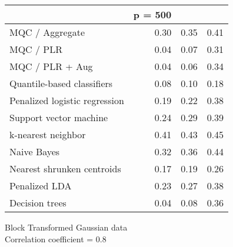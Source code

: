 \begin{table}[p]
\begin{minipage}{0.49\textwidth}
{\begin{tabular}{lrrr}
        \hline
        & p = 500 \\
        \hline

        MQC / Aggregate & 0.30 & 0.35 & 0.41 \\ 
        MQC / PLR & 0.04 & 0.07 & 0.31 \\ 
        MQC / PLR + Aug & 0.04 & 0.06 & 0.34 \\ 
        Quantile-based classifiers & 0.08 & 0.10 & 0.18 \\ 
        Penalized logistic regression & 0.19 & 0.22 & 0.38 \\ 
        Support vector machine & 0.24 & 0.29 & 0.39 \\ 
        k-nearest neighbor & 0.41 & 0.43 & 0.45 \\ 
        Naive Bayes & 0.32 & 0.36 & 0.44 \\ 
        Nearest shrunken centroids & 0.17 & 0.19 & 0.26 \\ 
        Penalized LDA & 0.23 & 0.27 & 0.38 \\ 
        Decision trees & 0.04 & 0.08 & 0.36 \\ 
        \hline
      \end{tabular}
    }
  \end{minipage}
  \begin{minipage}{0.49\textwidth}
    \centering
    Block Transformed Gaussian data \\
    Correlation coefficient = 0.8 \\[2ex]
\end{minipage}
\end{table}
